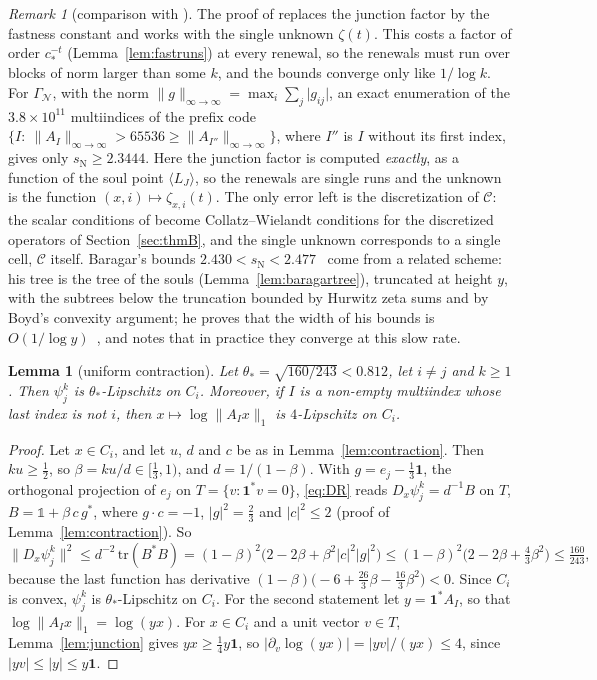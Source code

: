 \documentclass[11pt]{amsart}
\newcommand{\id}{\mathds{1}}
\newtheorem{lemma}[proposition]{Lemma}
\theoremstyle{definition}
\theoremstyle{remark}
\newtheorem{remark}[proposition]{Remark}
\newcommand{\one}{\mathbf 1}
\newcommand{\GN}{\Gamma_{\mathcal N}}
\newcommand{\sN}{s_{\mathrm N}}
\newcommand{\abs}[1]{\lvert #1\rvert}
\newcommand{\norm}[1]{\lVert #1\rVert}
\newcommand{\pr}[1]{\langle #1\rangle}
\begin{document}
\begin{remark}[comparison with {\cite[Thm.~1]{DL15JGA}}]\label{rem:JGA}
The proof of \cite[Thm.~1]{DL15JGA} replaces the junction factor by the fastness constant and works with the single unknown $\zeta(t)$. This costs a factor of order $c_*^{-t}$ (Lemma~\ref{lem:fastruns}) at every renewal, so the renewals must run over blocks of norm larger than some $k$, and the bounds converge only like $1/\log k$. For $\GN$, with the norm $\norm{g}_{\infty\to\infty}=\max_i\sum_j\abs{g_{ij}}$, an exact enumeration of the $3.8\times10^{11}$ multiindices of the prefix code $\{I:\ \norm{A_I}_{\infty\to\infty}>65536\ge\norm{A_{I''}}_{\infty\to\infty}\}$, where $I''$ is $I$ without its first index, gives only $\sN\ge2.3444$. Here the junction factor is computed {\em exactly}, as a function of the soul point $\pr{L_J}$, so the renewals are single runs and the unknown is the function $(x,i)\mapsto\zeta_{x,i}(t)$. The only error left is the discretization of $\mathcal C$: the scalar conditions of \cite{DL15JGA} become Collatz--Wielandt conditions for the discretized operators of Section~\ref{sec:thmB}, and the single unknown corresponds to a single cell, $\mathcal C$ itself.
Baragar's bounds $2.430<\sN<2.477$~\cite[Thm.~0.1]{Bar98} come from a related scheme: his tree is the tree of the souls (Lemma~\ref{lem:baragartree}), truncated at height $y$, with the subtrees below the truncation bounded by Hurwitz zeta sums and by Boyd's convexity argument; he proves that the width of his bounds is $O(1/\log y)$~\cite[Thm.~2.3]{Bar98}, and notes that in practice they converge at this slow rate.
\end{remark}

\begin{lemma}[uniform contraction]\label{lem:contr}
Let $\theta_*=\sqrt{160/243}<0.812$, let $i\neq j$ and $k\ge1$. Then $\psi_j^k$ is $\theta_*$-Lipschitz on $C_i$. Moreover, if $I$ is a non-empty multiindex whose last index is not $i$, then $x\mapsto\log\norm{A_Ix}_1$ is $4$-Lipschitz on $C_i$.
\end{lemma}

\begin{proof}
Let $x\in C_i$, and let $u$, $d$ and $c$ be as in Lemma~\ref{lem:contraction}. Then $ku\ge\frac12$, so $\beta=ku/d\in[\frac13,1)$, and $d=1/(1-\beta)$. With $g=e_j-\frac13\one$, the orthogonal projection of $e_j$ on $T=\{v:\one^*v=0\}$, \eqref{eq:DR} reads $D_x\psi_j^k=d^{-1}B$ on $T$, $B=\id+\beta\,c\,g^*$, where $g\cdot c=-1$, $\abs g^2=\frac23$ and $\abs c^2\le2$ (proof of Lemma~\ref{lem:contraction}). So
\[
  \norm{D_x\psi_j^k}^2\le d^{-2}\,\mathrm{tr}(B^*B)=(1-\beta)^2\bigl(2-2\beta+\beta^2\abs c^2\abs g^2\bigr)\le(1-\beta)^2\bigl(2-2\beta+\tfrac43\beta^2\bigr)\le\tfrac{160}{243},
\]
because the last function has derivative $(1-\beta)\bigl(-6+\frac{26}3\beta-\frac{16}3\beta^2\bigr)<0$. Since $C_i$ is convex, $\psi_j^k$ is $\theta_*$-Lipschitz on $C_i$. For the second statement let $y=\one^*A_I$, so that $\log\norm{A_Ix}_1=\log(yx)$. For $x\in C_i$ and a unit vector $v\in T$, Lemma~\ref{lem:junction} gives $yx\ge\frac14y\one$, so $\abs{\partial_v\log(yx)}=\abs{yv}/(yx)\le4$, since $\abs{yv}\le\abs y\le y\one$.
\end{proof}
\end{document}
